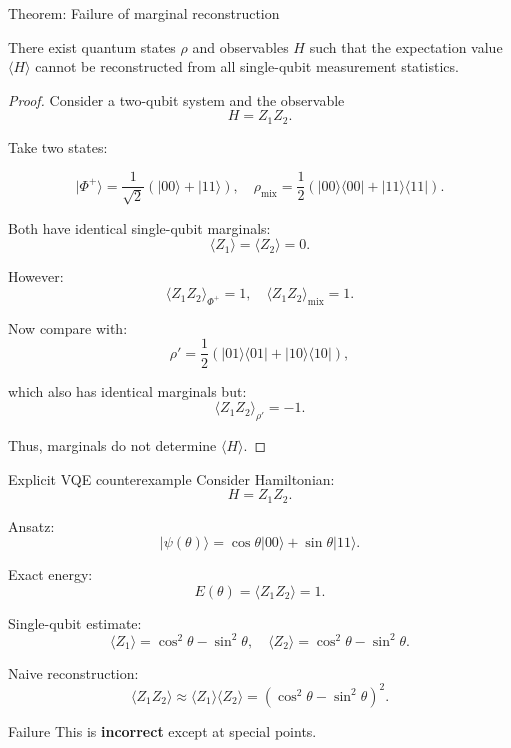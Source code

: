 \documentclass[aspectratio=169]{beamer}
\begin{document}
\begin{frame}{Theorem: Failure of marginal reconstruction}
\begin{theorem}
There exist quantum states $\rho$ and observables $H$ such that the expectation value $\langle H \rangle$ cannot be reconstructed from all single-qubit measurement statistics.
\end{theorem}

\begin{proof}
Consider a two-qubit system and the observable
\[
H = Z_1 Z_2.
\]

Take two states:

\[
|\Phi^+\rangle = \frac{1}{\sqrt{2}}(|00\rangle + |11\rangle),
\quad
\rho_{\text{mix}} = \frac{1}{2}(|00\rangle\langle00| + |11\rangle\langle11|).
\]

Both have identical single-qubit marginals:
\[
\langle Z_1 \rangle = \langle Z_2 \rangle = 0.
\]

However:
\[
\langle Z_1 Z_2 \rangle_{\Phi^+} = 1,
\quad
\langle Z_1 Z_2 \rangle_{\text{mix}} = 1.
\]

Now compare with:
\[
\rho' = \frac{1}{2}(|01\rangle\langle01| + |10\rangle\langle10|),
\]

which also has identical marginals but:
\[
\langle Z_1 Z_2 \rangle_{\rho'} = -1.
\]

Thus, marginals do not determine $\langle H \rangle$.
\end{proof}
\end{frame}


\begin{frame}{Explicit VQE counterexample}
Consider Hamiltonian:
\[
H = Z_1 Z_2.
\]

\medskip

Ansatz:
\[
|\psi(\theta)\rangle = \cos\theta |00\rangle + \sin\theta |11\rangle.
\]

\medskip

Exact energy:
\[
E(\theta) = \langle Z_1 Z_2 \rangle = 1.
\]

\medskip

Single-qubit estimate:
\[
\langle Z_1 \rangle = \cos^2\theta - \sin^2\theta,
\quad
\langle Z_2 \rangle = \cos^2\theta - \sin^2\theta.
\]

Naive reconstruction:
\[
\langle Z_1 Z_2 \rangle \approx \langle Z_1 \rangle \langle Z_2 \rangle
= (\cos^2\theta - \sin^2\theta)^2.
\]

\begin{block}{Failure}
This is \textbf{incorrect} except at special points.
\end{block}
\end{frame}
\end{document}
